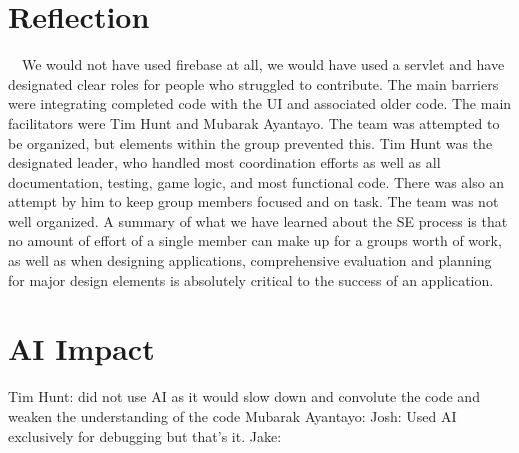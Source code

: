 \documentclass[12pt]{article}
\begin{document}
\section{Reflection}
\ \ We would not have used firebase at all, we would have used a servlet and have designated clear roles for people who struggled to contribute. The main barriers were integrating completed code with the UI and associated older code. The main facilitators were Tim Hunt and Mubarak Ayantayo. The team was attempted to be organized, but elements within the group prevented this. Tim Hunt was the designated leader, who handled most coordination efforts as well as all documentation, testing, game logic, and most functional code. There was also an attempt by him to keep group members focused and on task. The team was not well organized. A summary of what we have learned about the SE process is that no amount of effort of a single member can make up for a groups worth of work, as well as when designing applications, comprehensive evaluation and planning for major design elements is absolutely critical to the success of an application.

\section{AI Impact}
Tim Hunt: did not use AI as it would slow down and convolute the code and weaken the understanding of the code \newline
Mubarak Ayantayo: \newline
Josh: Used AI exclusively for debugging but that's it. \newline
Jake:
\end{document}
